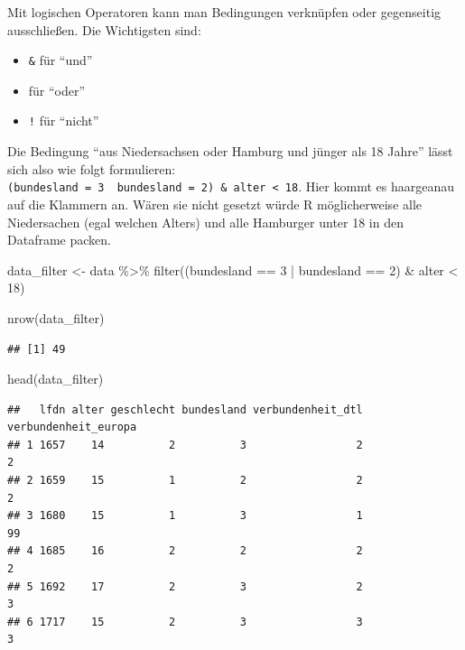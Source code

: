 \documentclass[
]{book}
\newenvironment{Shaded}{\begin{snugshade}}{\end{snugshade}}
\newcommand{\DecValTok}[1]{\textcolor[rgb]{0.00,0.00,0.81}{#1}}
\newcommand{\FunctionTok}[1]{\textcolor[rgb]{0.00,0.00,0.00}{#1}}
\newcommand{\NormalTok}[1]{#1}
\newcommand{\OtherTok}[1]{\textcolor[rgb]{0.56,0.35,0.01}{#1}}
\newcommand{\SpecialCharTok}[1]{\textcolor[rgb]{0.00,0.00,0.00}{#1}}
\begin{document}
Mit logischen Operatoren kann man Bedingungen verknüpfen oder gegenseitig ausschließen. Die Wichtigsten sind:

\begin{itemize}
\item
  \texttt{\&} für ``und''
\item
  \texttt{\textbar{}} für ``oder''
\item
  \texttt{!} für ``nicht''
\end{itemize}

Die Bedingung ``aus Niedersachsen oder Hamburg und jünger als 18 Jahre'' lässt sich also wie folgt formulieren: \texttt{(bundesland\ =\ 3\ \textbar{}\ bundesland\ =\ 2)\ \&\ alter\ \textless{}\ 18}. Hier kommt es haargeanau auf die Klammern an. Wären sie nicht gesetzt würde R möglicherweise alle Niedersachen (egal welchen Alters) und alle Hamburger unter 18 in den Dataframe packen.

\begin{Shaded}
\begin{Highlighting}[]
\NormalTok{data\_filter }\OtherTok{\textless{}{-}}\NormalTok{ data }\SpecialCharTok{\%\textgreater{}\%} 
  \FunctionTok{filter}\NormalTok{((bundesland }\SpecialCharTok{==} \DecValTok{3} \SpecialCharTok{|}\NormalTok{ bundesland }\SpecialCharTok{==} \DecValTok{2}\NormalTok{) }\SpecialCharTok{\&}\NormalTok{ alter }\SpecialCharTok{\textless{}} \DecValTok{18}\NormalTok{)}

\FunctionTok{nrow}\NormalTok{(data\_filter)}
\end{Highlighting}
\end{Shaded}

\begin{verbatim}
## [1] 49
\end{verbatim}

\begin{Shaded}
\begin{Highlighting}[]
\FunctionTok{head}\NormalTok{(data\_filter)}
\end{Highlighting}
\end{Shaded}

\begin{verbatim}
##   lfdn alter geschlecht bundesland verbundenheit_dtl verbundenheit_europa
## 1 1657    14          2          3                 2                    2
## 2 1659    15          1          2                 2                    2
## 3 1680    15          1          3                 1                   99
## 4 1685    16          2          2                 2                    2
## 5 1692    17          2          3                 2                    3
## 6 1717    15          2          3                 3                    3
\end{verbatim}
\end{document}
